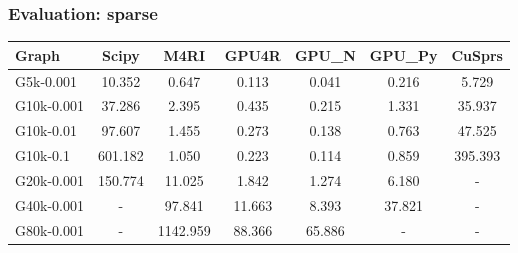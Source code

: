 \documentclass[xcolor=table]{beamer}
\begin{document}
\begin{frame} \frametitle{Evaluation: sparse}

{\small
  \begin{tabular}{| l | c | c | c | c | c | c | }
      \hline
      Graph              & Scipy   & M4RI     & GPU4R  & GPU\_N & GPU\_Py & CuSprs  \\
      \hline
      \hline
      \small{G5k-0.001}  & 10.352  & 0.647    & 0.113  & 0.041  & 0.216   & 5.729   \\
      \small{G10k-0.001} & 37.286  & 2.395    & 0.435  & 0.215  & 1.331   & 35.937  \\
      \small{G10k-0.01}  & 97.607  & 1.455    & 0.273  & 0.138  & 0.763   & 47.525  \\
      \small{G10k-0.1}   & 601.182 & 1.050    & 0.223  & 0.114  & 0.859   & 395.393 \\
      \small{G20k-0.001} & 150.774 & 11.025   & 1.842  & 1.274  & 6.180   & -       \\
      \small{G40k-0.001} & -       & 97.841   & 11.663 & 8.393  & 37.821  & -       \\
      \small{G80k-0.001} & -       & 1142.959 & 88.366 & 65.886 & -       & -       \\
      \hline
    \end{tabular}
}
\end{frame}
\end{document}
